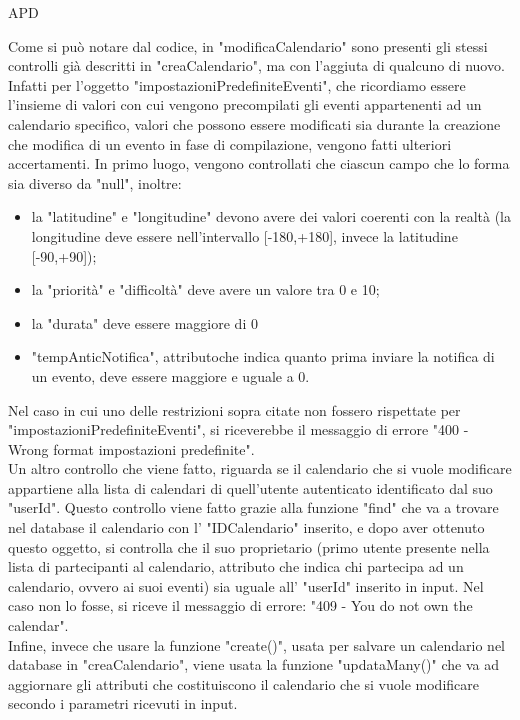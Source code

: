 \begin{listaPersonale} {APD}
\begin{listaPersonale2}[APD]{}
                Come si può notare dal codice, in "modificaCalendario" sono presenti gli stessi controlli già descritti in "creaCalendario", ma con l'aggiuta di qualcuno di nuovo. Infatti per l'oggetto "impostazioniPredefiniteEventi", che ricordiamo essere l'insieme di valori con cui vengono precompilati gli eventi appartenenti ad un calendario specifico, valori che possono essere modificati sia durante la creazione che modifica di un evento in fase di compilazione, vengono fatti ulteriori accertamenti. In primo luogo, vengono controllati che ciascun campo che lo forma sia diverso da "null", inoltre:
                \begin{itemize}
                    \item la "latitudine" e "longitudine" devono avere dei valori coerenti con la realtà (la longitudine deve essere nell'intervallo [-180,+180], invece la latitudine [-90,+90]);
                    \item la "priorità" e "difficoltà" deve avere un valore tra 0 e 10;
                    \item la "durata" deve essere maggiore di 0
                    \item "tempAnticNotifica", attributoche indica quanto prima inviare la notifica di un evento, deve essere maggiore e uguale a 0.
                \end{itemize}
                Nel caso in cui uno delle restrizioni sopra citate non fossero rispettate per "impostazioniPredefiniteEventi", si riceverebbe il messaggio di errore "400 - Wrong format impostazioni predefinite". \\
                Un altro controllo che viene fatto, riguarda se il calendario che si vuole modificare appartiene alla lista di calendari di quell'utente autenticato identificato dal suo "userId". Questo controllo viene fatto grazie alla funzione "find" che va a trovare nel database il calendario con l' "IDCalendario" inserito, e dopo aver ottenuto questo oggetto, si controlla che il suo proprietario (primo utente presente nella lista di partecipanti al calendario, attributo che indica chi partecipa ad un calendario, ovvero ai suoi eventi) sia uguale all' "userId" inserito in input. Nel caso non lo fosse, si riceve il messaggio di errore: "409 - You do not own the calendar". \\
                Infine, invece che usare la funzione "create()", usata per salvare un calendario nel database in "creaCalendario", viene usata la funzione "updataMany()" che va ad aggiornare gli attributi che costituiscono il calendario che si vuole modificare secondo i parametri ricevuti in input.

\end{listaPersonale2}
\end{listaPersonale}
